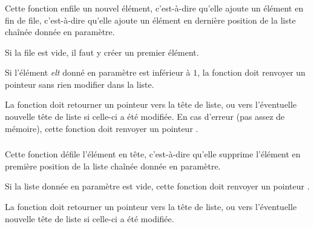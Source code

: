 \clearpage


\subsubsection*{}

\noindent Cette fonction enfile un nouvel élément, c'est-à-dire qu'elle ajoute un élément en fin de file, c'est-à-dire qu'elle ajoute un élément en dernière position de la liste chaînée donnée en paramètre.

\smallskip

\noindent Si la file est vide, il faut y créer un premier élément.

\noindent Si l'élément \textit{elt} donné en paramètre est inférieur à $ 1 $, la fonction doit renvoyer un pointeur  sans rien modifier dans la liste.

\smallskip

\noindent La fonction doit retourner un pointeur vers la tête de liste, ou vers l'éventuelle nouvelle tête de liste si celle-ci a été modifiée.
%
En cas d'erreur (pas assez de mémoire), cette fonction doit renvoyer un pointeur .

%

\bigskip


\subsubsection*{}

\noindent Cette fonction défile l'élément en tête, c'est-à-dire qu'elle supprime l'élément en première position de la liste chaînée donnée en paramètre.

\smallskip

\noindent Si la liste donnée en paramètre est vide, cette fonction doit renvoyer un pointeur .

\smallskip

\noindent La fonction doit retourner un pointeur vers la tête de liste, ou vers l'éventuelle nouvelle tête de liste si celle-ci a été modifiée.

